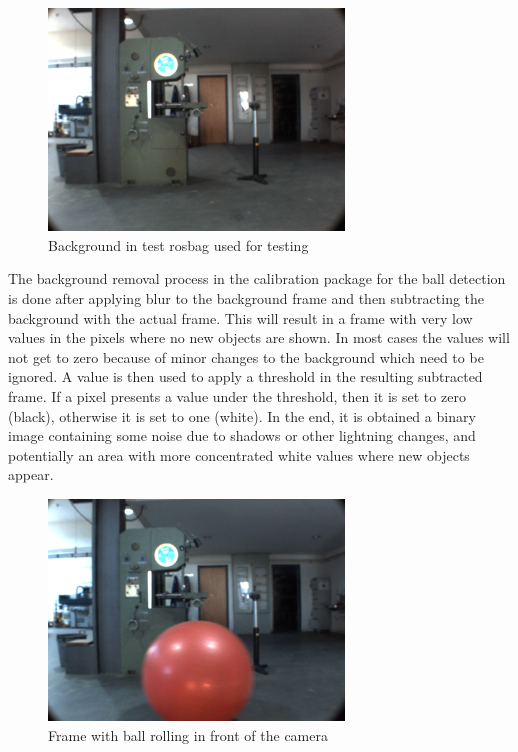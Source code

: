 \begin{figure}[htp]
	
	\centering
	\includegraphics[width=0.7\textwidth]{capcalib/imgs/background.png}
	
	\caption{Background in test rosbag used for testing}
	\label{fig:background}
	
\end{figure}

The background removal process in the calibration package for the ball detection is done after applying blur to the background frame and then subtracting the background with the actual frame. This will result in a frame with very low values in the pixels where no new objects are shown. In most cases the values will not get to zero because of minor changes to the background which need to be ignored. A value is then used to apply a threshold in the resulting subtracted frame. If a pixel presents a value under the threshold, then it is set to zero (black), otherwise it is set to one (white). In the end, it is obtained a binary image containing some noise due to shadows or other lightning changes, and potentially an area with more concentrated white values where new objects appear. 


\begin{figure}[htp]
	
	\centering
	\includegraphics[width=0.7\textwidth]{capcalib/imgs/ball_test.png}
	
	\caption{Frame with ball rolling in front of the camera}
	\label{fig:balltest}
	
\end{figure}


